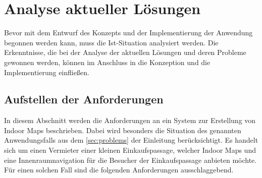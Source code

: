 \chapter{Analyse aktueller Lösungen}
\label{ch:analysis}
Bevor mit dem Entwurf des Konzepts und der Implementierung der Anwendung begonnen werden kann, muss die Ist-Situation analysiert werden.
Die Erkenntnisse, die bei der Analyse der aktuellen Lösungen und deren Probleme gewonnen werden, können im Anschluss in die Konzeption und die Implementierung einfließen.

\section{Aufstellen der Anforderungen}
In diesem Abschnitt werden die Anforderungen an ein System zur Erstellung von Indoor Maps beschrieben.
Dabei wird besonders die Situation des genannten Anwendungsfalls aus dem \autoref{sec:problems} der Einleitung berücksichtigt.
Es handelt sich um einen Vermieter einer kleinen Einkaufspassage, welcher Indoor Maps und eine Innenraumnavigation für die Besucher der Einkaufspassage anbieten möchte.
Für einen solchen Fall sind die folgenden Anforderungen ausschlaggebend.
